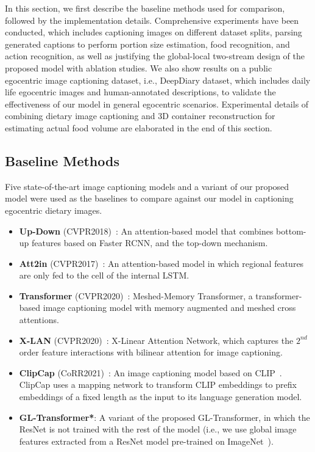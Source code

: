 \documentclass[journal]{IEEEtran}
\begin{document}
In this section, we first describe the baseline methods used for comparison, followed by the implementation details. Comprehensive experiments have been conducted, which includes captioning images on different dataset splits, parsing generated captions to perform portion size estimation, food recognition, and action recognition, as well as justifying the global-local two-stream design of the proposed model with ablation studies. We also show results on a public egocentric image captioning dataset, i.e., DeepDiary dataset, which includes daily life egocentric images and human-annotated descriptions, to validate the effectiveness of our model in general egocentric scenarios. Experimental details of combining dietary image captioning and 3D container reconstruction for estimating actual food volume are elaborated in the end of this section.



\subsection{Baseline Methods}

Five state-of-the-art image captioning models and a variant of our proposed model were used as the baselines to compare against our model in captioning egocentric dietary images.

\begin{itemize}
    \item \textbf{Up-Down} (CVPR2018)~\cite{anderson2018bottom}: An attention-based model that combines bottom-up features based on Faster RCNN, and the top-down mechanism.
    
    \item \textbf{Att2in} (CVPR2017)~\cite{rennie2017self}: An attention-based model in which regional features are only fed to the cell of the internal LSTM.
    
    \item {}\textbf{Transformer} (CVPR2020)~\cite{cornia2020meshed}: Meshed-Memory Transformer, a transformer-based image captioning model with memory augmented and meshed cross attentions.
    
    \item \textbf{X-LAN} (CVPR2020)~\cite{xlinear2020cvpr}: X-Linear Attention Network, which captures the $2^{nd}$ order feature interactions with bilinear attention for image captioning.
    
    \item \textbf{ClipCap} (CoRR2021)~\cite{mokady2021clipcap}: An image captioning model based on CLIP~\cite{radford2021learning}. ClipCap uses a mapping network to transform CLIP embeddings to prefix embeddings of a fixed length as the input to its language generation model.
    
    \item \textbf{GL-Transformer*}: A variant of the proposed GL-Transformer, in which the ResNet is not trained with the rest of the model (i.e., we use global image features extracted from a ResNet model pre-trained on ImageNet~\cite{deng2009imagenet}).
\end{itemize}
\end{document}
